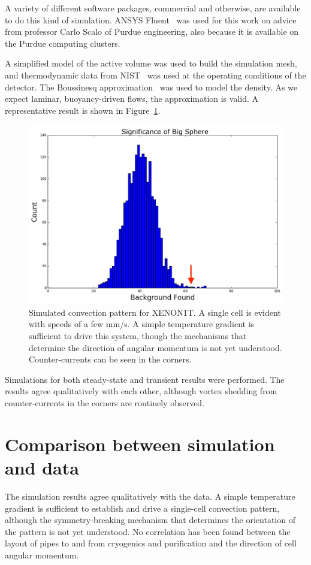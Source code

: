 A variety of different software packages, commercial and otherwise, are available to do this kind of simulation. ANSYS Fluent~\cite{fluent} was used for this work on advice from professor Carlo Scalo of Purdue engineering, also because it is available on the Purdue computing clusters.

A simplified model of the active volume was used to build the simulation mesh, and thermodynamic data from NIST~\cite{NIST} was used at the operating conditions of the detector. The Boussinesq approximation~\cite{Boussinesq:1897} was used to model the density. As we expect laminar, buoyancy-driven flows, the approximation is valid. A representative result is shown in Figure~\ref{fig:cfd_sample}.

\begin{figure}[htb]
    \includegraphics[width=\textwidth]{figures/rnveto/BigSphere}
    \caption{Simulated convection pattern for XENON1T. A single cell is evident with speeds of a few mm/s. A simple temperature gradient is sufficient to drive this system, though the mechanisms that determine the direction of angular momentum is not yet understood. Counter-currents can be seen in the corners.}\label{fig:cfd_sample}
\end{figure}

Simulations for both steady-state and transient results were performed. The results agree qualitatively with each other, although vortex shedding from counter-currents in the corners are routinely observed.

\section{Comparison between simulation and data}

The simulation results agree qualitatively with the data. A simple temperature gradient is sufficient to establish and drive a single-cell convection pattern, although the symmetry-breaking mechanism that determines the orientation of the pattern is not yet understood. No correlation has been found between the layout of pipes to and from cryogenics and purification and the direction of cell angular momentum.

